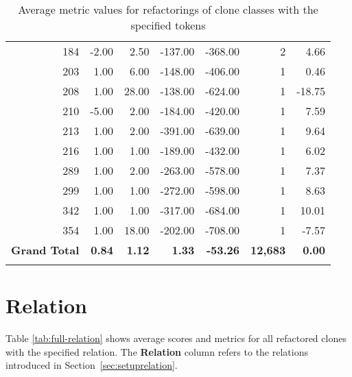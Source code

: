 \begin{appendices}
\begin{longtable}[c]{@{}rrrrrrr@{}}
184 & -2.00 & 2.50 & -137.00 & -368.00 & 2 & 4.66 \\

203 & 1.00 & 6.00 & -148.00 & -406.00 & 1 & 0.46 \\

208 & 1.00 & 28.00 & -138.00 & -624.00 & 1 & -18.75 \\

210 & -5.00 & 2.00 & -184.00 & -420.00 & 1 & 7.59 \\

213 & 1.00 & 2.00 & -391.00 & -639.00 & 1 & 9.64 \\

216 & 1.00 & 1.00 & -189.00 & -432.00 & 1 & 6.02 \\

289 & 1.00 & 2.00 & -263.00 & -578.00 & 1 & 7.37 \\

299 & 1.00 & 1.00 & -272.00 & -598.00 & 1 & 8.63 \\

342 & 1.00 & 1.00 & -317.00 & -684.00 & 1 & 10.01 \\

354 & 1.00 & 18.00 & -202.00 & -708.00 & 1 & -7.57 \\* \midrule
\textbf{Grand Total} & \textbf{0.84} & \textbf{1.12} & \textbf{1.33} & \textbf{-53.26} & \textbf{12,683} & \textbf{0.00} \\* \bottomrule
\caption{Average metric values for refactorings of clone classes with the specified tokens}
\label{tab:full-tokens}\\
\end{longtable}
\newpage

\section{Relation}
Table \ref{tab:full-relation} shows average scores and metrics for all refactored clones with the specified relation. The \textbf{Relation} column refers to the relations introduced in Section~\ref{sec:setuprelation}.


\end{appendices}
